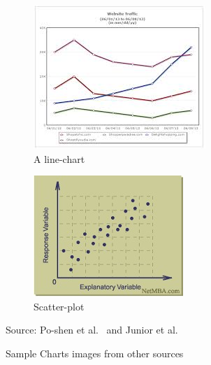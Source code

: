 \documentclass[12pt, a4paper,oneside]{report}
\newcommand{\source}[1]{\vspace{-3pt} \caption*{ Source: {#1}} }
\begin{document}
\begin{figure}[!htbp]
	\begin{subfigure}[b]{0.5\textwidth}
		\includegraphics[width=\textwidth]{rand3}
		\caption{A line-chart}
		\label{fig:rand3}
	\end{subfigure}
	\begin{subfigure}[b]{0.5\textwidth}
		\includegraphics[width=\textwidth]{rand4}
		\caption{Scatter-plot}
		\label{fig:rand4}
	\end{subfigure}
	\caption{Sample Charts images from other sources}
    \label{fig:random}
    \source{Po-shen et al.~\cite{lee2016viziometrix} and Junior et al.~\cite{junior2017archi}}
\end{figure}
\end{document}
